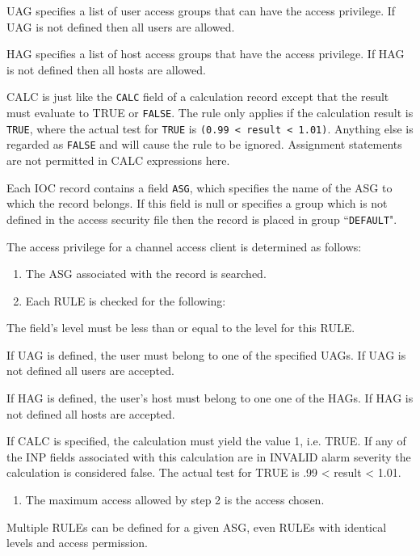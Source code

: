 UAG specifies a list of user access groups that can have the access privilege. If UAG is not defined 
then all users are allowed.

HAG specifies a list of host access groups that have the access privilege. If HAG is not defined then 
all hosts are allowed.

CALC is just like the \verb|CALC| field of a calculation record except that the result must evaluate to TRUE 
or \verb|FALSE|. The rule only applies if the calculation result is \verb|TRUE|, where the actual test for \verb|TRUE| is 
\verb|(0.99 < result < 1.01)|. Anything else is regarded as \verb|FALSE| and will cause the rule to be 
ignored. Assignment statements are not permitted in CALC expressions here.

Each IOC record contains a field \verb|ASG|, which specifies the name of the ASG to which the record belongs. If this field is 
null or specifies a group which is not defined in the access security file then the record is placed in group ``\verb|DEFAULT|".

The access privilege for a channel access client is determined as follows:

\begin{enumerate}\item The ASG associated with the record is searched.

\item Each RULE is checked for the following:

\end{enumerate}The field's level must be less than or equal to the level for this RULE.

If UAG is defined, the user must belong to one of the specified UAGs. If UAG is not defined all users are 
accepted.

If HAG is defined, the user's host must belong to one one of the HAGs. If HAG is not defined all hosts are 
accepted.

If CALC is specified, the calculation must yield the value 1, i.e. TRUE. If any of the INP fields associated 
with this calculation are in INVALID alarm severity the calculation is considered false. The actual test for 
TRUE is .99 \textless{} result \textless{} 1.01.

\begin{enumerate}\item The maximum access allowed by step 2 is the access chosen.

\end{enumerate}Multiple RULEs can be defined for a given ASG, even RULEs with identical levels and access permission.

